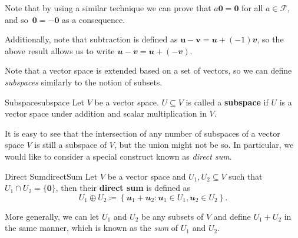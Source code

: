 \documentclass[math, code]{amznotes}
\theoremstyle{remark}
\newcommand{\zero}{\mathbf{0}}
\begin{document}
Note that by using a similar technique we can prove that $a\zero = \zero$ for all $a \in \mathcal{F}$, and so~$\zero = -\zero$ as a consequence.

Additionally, note that subtraction is defined as $\mathbf{u - v} = \mathbfit{u} + (-1)\mathbfit{v}$, so the above result allows us to write $\mathbfit{u - v} = \mathbfit{u} + (-\mathbfit{v})$.

Note that a vector space is extended based on a set of vectors, so we can define \textit{subspaces} similarly to the notion of subsets.
\begin{dfnbox}{Subspace}{subspace}
    Let $V$ be a vector space. $U \subseteq V$ is called a {\color{red} \textbf{subspace}} if $U$ is a vector space under addition and scalar multiplication in $V$.
\end{dfnbox}
It is easy to see that the intersection of any number of subspaces of a vector space $V$ is still a subspace of $V$, but the union might not be so. In particular, we would like to consider a special construct known as \textit{direct sum}.
\begin{dfnbox}{Direct Sum}{directSum}
    Let $V$ be a vector space and $U_1, U_2 \subseteq V$ such that $U_1 \cap U_2 = \{\zero\}$, then their {\color{red} \textbf{direct sum}} is defined as
    \begin{equation*}
        U_1 \oplus U_2 \coloneqq \left\{\mathbfit{u}_1 + \mathbfit{u}_2 \colon \mathbfit{u}_1 \in U_1, \mathbfit{u}_2 \in U_2\right\}.
    \end{equation*}
\end{dfnbox}
More generally, we can let $U_1$ and $U_2$ be any subsets of $V$ and define $U_1 + U_2$ in the same manner, which is known as the \textit{sum} of $U_1$ and $U_2$.
\end{document}
